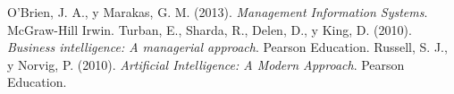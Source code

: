 \documentclass[final, fmstyle, 12pt]{article}
\begin{document}
\newpage 


\newpage 


\newpage 

\newpage 


\newpage

% 
\begin{thebibliography}{99}
     O'Brien, J. A., y Marakas, G. M. (2013). \textit{Management Information Systems}. McGraw-Hill Irwin.
     Turban, E., Sharda, R., Delen, D., y King, D. (2010). \textit{Business intelligence: A managerial approach}. Pearson Education.
     Russell, S. J., y Norvig, P. (2010). \textit{Artificial Intelligence: A Modern Approach}. Pearson Education.
\end{thebibliography}
\end{document}
